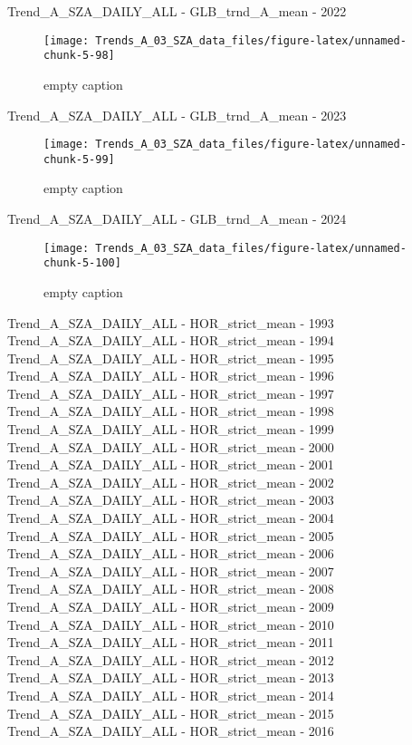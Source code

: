 \documentclass[
  10pt,
  a4paper,oneside]{article}
\begin{document}
Trend\_A\_SZA\_DAILY\_ALL - GLB\_trnd\_A\_mean - 2022

\begin{figure}[!ht]

{\centering \texttt{[image: Trends\_A\_03\_SZA\_data\_files/figure-latex/unnamed-chunk-5-98]} 

}

\caption{ empty caption }\label{fig:unnamed-chunk-5-98}
\end{figure}

Trend\_A\_SZA\_DAILY\_ALL - GLB\_trnd\_A\_mean - 2023

\begin{figure}[!ht]

{\centering \texttt{[image: Trends\_A\_03\_SZA\_data\_files/figure-latex/unnamed-chunk-5-99]} 

}

\caption{ empty caption }\label{fig:unnamed-chunk-5-99}
\end{figure}

Trend\_A\_SZA\_DAILY\_ALL - GLB\_trnd\_A\_mean - 2024

\begin{figure}[!ht]

{\centering \texttt{[image: Trends\_A\_03\_SZA\_data\_files/figure-latex/unnamed-chunk-5-100]} 

}

\caption{ empty caption }\label{fig:unnamed-chunk-5-100}
\end{figure}

Trend\_A\_SZA\_DAILY\_ALL - HOR\_strict\_mean - 1993
Trend\_A\_SZA\_DAILY\_ALL - HOR\_strict\_mean - 1994
Trend\_A\_SZA\_DAILY\_ALL - HOR\_strict\_mean - 1995
Trend\_A\_SZA\_DAILY\_ALL - HOR\_strict\_mean - 1996
Trend\_A\_SZA\_DAILY\_ALL - HOR\_strict\_mean - 1997
Trend\_A\_SZA\_DAILY\_ALL - HOR\_strict\_mean - 1998
Trend\_A\_SZA\_DAILY\_ALL - HOR\_strict\_mean - 1999
Trend\_A\_SZA\_DAILY\_ALL - HOR\_strict\_mean - 2000
Trend\_A\_SZA\_DAILY\_ALL - HOR\_strict\_mean - 2001
Trend\_A\_SZA\_DAILY\_ALL - HOR\_strict\_mean - 2002
Trend\_A\_SZA\_DAILY\_ALL - HOR\_strict\_mean - 2003
Trend\_A\_SZA\_DAILY\_ALL - HOR\_strict\_mean - 2004
Trend\_A\_SZA\_DAILY\_ALL - HOR\_strict\_mean - 2005
Trend\_A\_SZA\_DAILY\_ALL - HOR\_strict\_mean - 2006
Trend\_A\_SZA\_DAILY\_ALL - HOR\_strict\_mean - 2007
Trend\_A\_SZA\_DAILY\_ALL - HOR\_strict\_mean - 2008
Trend\_A\_SZA\_DAILY\_ALL - HOR\_strict\_mean - 2009
Trend\_A\_SZA\_DAILY\_ALL - HOR\_strict\_mean - 2010
Trend\_A\_SZA\_DAILY\_ALL - HOR\_strict\_mean - 2011
Trend\_A\_SZA\_DAILY\_ALL - HOR\_strict\_mean - 2012
Trend\_A\_SZA\_DAILY\_ALL - HOR\_strict\_mean - 2013
Trend\_A\_SZA\_DAILY\_ALL - HOR\_strict\_mean - 2014
Trend\_A\_SZA\_DAILY\_ALL - HOR\_strict\_mean - 2015
Trend\_A\_SZA\_DAILY\_ALL - HOR\_strict\_mean - 2016
\end{document}
